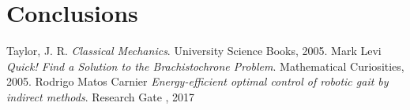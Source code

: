 \documentclass[hidelinks, 11pt]{article}
\newcommand{\Lagr}{\mathcal{L}}
\begin{document}





\section{Conclusions}

\begin{thebibliography}{1}

 Taylor, J. R. \textit{Classical
  Mechanics}. University Science Books, 2005. 
 Mark Levi \textit{Quick! Find a Solution to the
Brachistochrone Problem}. Mathematical Curiosities, 2005. 
 Rodrigo Matos Carnier \textit{Energy-efficient optimal control of robotic gait by indirect methods}. Research Gate , 2017

\end{thebibliography}
\end{document}
